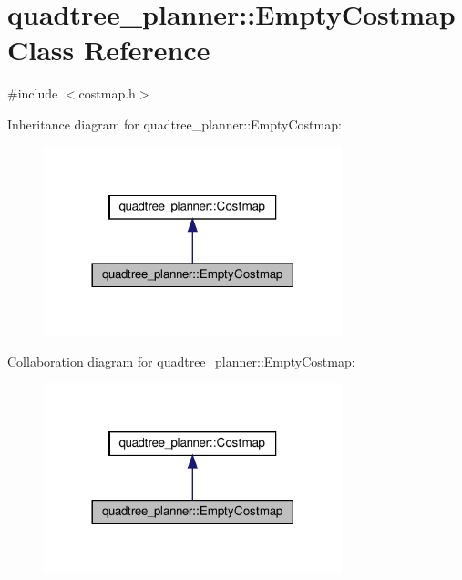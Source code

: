 \hypertarget{classquadtree__planner_1_1EmptyCostmap}{}\section{quadtree\+\_\+planner\+:\+:Empty\+Costmap Class Reference}
\label{classquadtree__planner_1_1EmptyCostmap}


{\ttfamily \#include $<$costmap.\+h$>$}



Inheritance diagram for quadtree\+\_\+planner\+:\+:Empty\+Costmap\+:\nopagebreak
\begin{figure}[H]
\begin{center}
\leavevmode
\includegraphics[width=245pt]{classquadtree__planner_1_1EmptyCostmap__inherit__graph}
\end{center}
\end{figure}


Collaboration diagram for quadtree\+\_\+planner\+:\+:Empty\+Costmap\+:\nopagebreak
\begin{figure}[H]
\begin{center}
\leavevmode
\includegraphics[width=245pt]{classquadtree__planner_1_1EmptyCostmap__coll__graph}
\end{center}
\end{figure}
